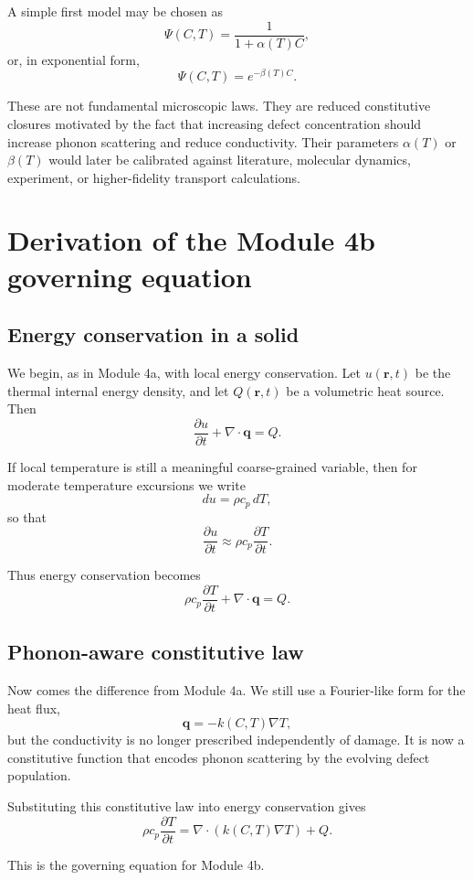 \documentclass[11pt]{article}
\newcommand{\qvec}{\mathbf{q}}
\newcommand{\rvec}{\mathbf{r}}
\begin{document}
A simple first model may be chosen as
\[
 \Psi(C,T) = \frac{1}{1+\alpha(T) C},
\]
or, in exponential form,
\[
 \Psi(C,T) = e^{-\beta(T) C}.
\]

These are not fundamental microscopic laws. They are reduced constitutive closures motivated by the fact that increasing defect concentration should increase phonon scattering and reduce conductivity. Their parameters $\alpha(T)$ or $\beta(T)$ would later be calibrated against literature, molecular dynamics, experiment, or higher-fidelity transport calculations.

\section{Derivation of the Module 4b governing equation}

\subsection{Energy conservation in a solid}

We begin, as in Module 4a, with local energy conservation. Let $u(\rvec,t)$ be the thermal internal energy density, and let $Q(\rvec,t)$ be a volumetric heat source. Then
\[
 \frac{\partial u}{\partial t} + \nabla\cdot \qvec = Q.
\]

If local temperature is still a meaningful coarse-grained variable, then for moderate temperature excursions we write
\[
 du = \rho c_p \, dT,
\]
so that
\[
 \frac{\partial u}{\partial t} \approx \rho c_p \frac{\partial T}{\partial t}.
\]

Thus energy conservation becomes
\[
 \rho c_p \frac{\partial T}{\partial t} + \nabla\cdot \qvec = Q.
\]

\subsection{Phonon-aware constitutive law}

Now comes the difference from Module 4a. We still use a Fourier-like form for the heat flux,
\[
 \qvec = -k(C,T)\nabla T,
\]
but the conductivity is no longer prescribed independently of damage. It is now a constitutive function that encodes phonon scattering by the evolving defect population.

Substituting this constitutive law into energy conservation gives
\[
\rho c_p \frac{\partial T}{\partial t} = \nabla\cdot\left(k(C,T)\nabla T\right) + Q.
\]

This is the governing equation for Module 4b.
\end{document}
